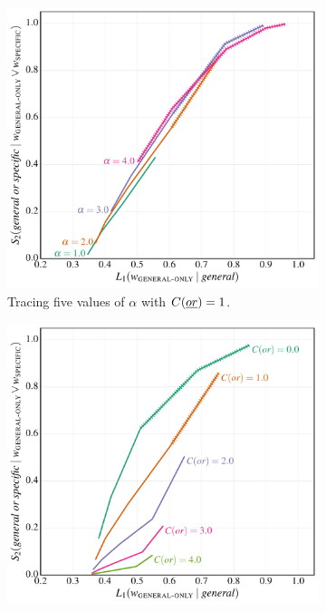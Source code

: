 \documentclass[12pt,twoside]{article}
\newcommand{\word}[1]{\emph{#1}}
\newcommand{\Costs}{C}
\renewcommand{\_}{\textbf{\textunderscore\hspace{-4pt}\textunderscore\hspace{-3pt}\textunderscore\hspace{-4pt}\textunderscore}\hspace{0.5pt}}			%
\begin{document}
\begin{figure}[tp]
  \centering
  \begin{subfigure}{0.48\textwidth}
    \includegraphics[width=1\textwidth]{fig/Q-implicature-simulation-alphas} 
    \caption{Tracing five values of $\alpha$ with $\Costs(\word{or}) =1$.}\label{fig:qsims:alphas}
  \end{subfigure}
  \hfill
  \begin{subfigure}{0.48\textwidth}
    \includegraphics[width=1\textwidth]{fig/Q-implicature-simulation-or} 

\end{subfigure}
\end{figure}
\end{document}
